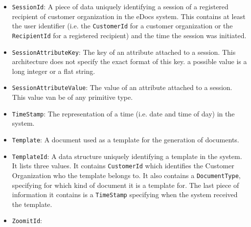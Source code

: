 \documentclass[a4paper,10pt]{article}
\begin{document}
\begin{itemize}
    \item \texttt{SessionId}: A piece of data uniquely identifying a session of a registered recipient of customer organization in the eDocs system. This contains at least the user identifier (i.e. the \texttt{CustomerId} for a customer organization or the \texttt{RecipientId} for a registered recipient) and the time the session was initiated.
    
    \item \texttt{SessionAttributeKey}: The key of an attribute attached to a session. This architecture does not specify the exact format of this key. a possible value is a long integer or a flat string.
    
    \item \texttt{SessionAttributeValue}: The value of an attribute attached to a session. This value van be of any primitive type.
    
    \item \texttt{TimeStamp}: The representation of a time (i.e. date and time of day) in the system.
    
    \item \texttt{Template}: A document used as a template for the generation of documents.
    
    \item \texttt{TemplateId}: A data structure uniquely identifying a template in the system. It lists three values. It contains \texttt{CustomerId} which identifies the Customer Organization who the template belongs to. It also contains a \texttt{DocumentType}, specifying for which kind of document it is a template for. The last piece of information it contains is a \texttt{TimeStamp} specifying when the system received the template.
    
    \item \texttt{ZoomitId}:
\end{itemize}
\end{document}

